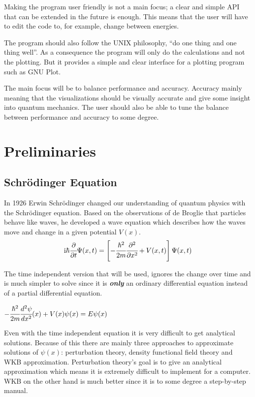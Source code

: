 \documentclass[11pt,DIV=10,final]{scrreprt} %
\newcommand{\mi}{{\text{i}}}
\begin{document}
Making the program user friendly is not a main focus; a clear and simple API
that can be extended in the future is enough. This means that the user will have to edit the code
to, for example, change between energies.

The program should also follow the UNIX philosophy, ``do one thing and one thing well''.
As a consequence the program will only do the calculations and not the plotting. But it
provides a simple and clear interface for a plotting program such as GNU Plot.

The main focus will be to balance performance and accuracy. Accuracy mainly meaning that the
visualizations should be visually accurate and give some insight into quantum mechanics.
The user should also be able to tune the balance between performance and accuracy to some
degree.

\chapter{Preliminaries}


\section{Schrödinger Equation}
In 1926 Erwin Schrödinger changed our understanding of quantum physics with the Schrödinger equation. Based on the observations of de Broglie that particles
behave like waves, he developed a wave equation which describes how the waves move and change in a given potential $V(x)$.
\begin{align*}
  \mi\hbar {\cfrac {\partial }{\partial t}}\Psi (x,t)=\left[-{\cfrac {\hbar ^{2}}{2m}}{\cfrac {\partial ^{2}}{\partial x^{2}}}+V(x,t)\right]\Psi (x,t)
\end{align*}

The time independent version that will be used, ignores the change over time and is much simpler to solve since it is \emph{\textbf{only}} an ordinary differential equation instead of a
partial differential equation.
\begin{center}
\begin{math}
  -{\cfrac{\hbar^{2}}{2m}}  \cfrac{d^{2} \psi}{dx^{2}} (x) + V(x) \psi(x) = E \psi(x)
\end{math}
\end{center}

Even with the time independent equation it is very difficult to get analytical solutions. Because of this there are mainly three approaches to
approximate solutions of $\psi(x)$: perturbation theory, density functional field theory and WKB approximation. Perturbation theory's goal is to give an analytical approximation which means it
is extremely difficult to implement for a computer. WKB on the other hand is much better since it is to some degree a step-by-step manual.
\end{document}

